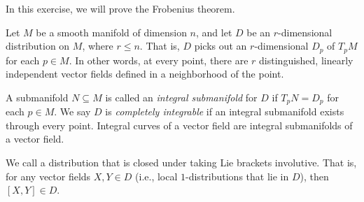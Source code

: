 \documentclass[10pt]{mypackage}
\begin{document}
\begin{problem}[Problem 3]
  In this exercise, we will prove the Frobenius theorem.\newline

  Let $M$ be a smooth manifold of dimension $n$, and let $D$ be an $r$-dimensional distribution on $M$, where $r\leq n$. That is, $D$ picks out an $r$-dimensional $D_p$ of $T_pM$ for each $p\in M$. In other words, at every point, there are $r$ distinguished, linearly independent vector fields defined in a neighborhood of the point.\newline

  A submanifold $N\subseteq M$ is called an \textit{integral submanifold} for $D$ if $T_pN = D_p$ for each $p\in M$. We say $D$ is \textit{completely integrable} if an integral submanifold exists through every point. Integral curves of a vector field are integral submanifolds of a vector field.\newline

  We call a distribution that is closed under taking Lie brackets involutive. That is, for any vector fields $X,Y\in D$ (i.e., local $1$-distributions that lie in $D$), then $\left[ X,Y \right]\in D$.\newline


\end{problem}
\end{document}
